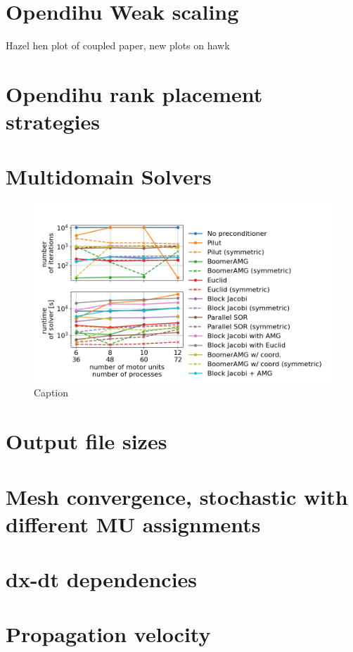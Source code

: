 \section{Opendihu Weak scaling}
Hazel hen plot of coupled paper, new plots on hawk
\section{Opendihu rank placement strategies}

\section{Multidomain Solvers}

\begin{figure}[H]%
  \centering%
  \includegraphics[width=\textwidth]{images/results/studies/multidomain_solvers_all.png}%
  \caption{Caption}%
  \label{fig:fig1}%
\end{figure}
\section{Output file sizes}
\section{Mesh convergence, stochastic with different MU assignments}
\section{dx-dt dependencies}
\section{Propagation velocity}

